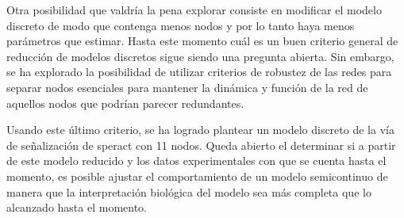 Otra posibilidad que valdría la pena explorar consiste en modificar el modelo discreto de modo que contenga menos nodos y por lo tanto haya menos parámetros que estimar. Hasta este momento cuál es un buen criterio general de reducción de modelos discretos sigue siendo una pregunta abierta. Sin embargo, se ha explorado la posibilidad de utilizar criterios de robustez de las redes para separar nodos esenciales para mantener la dinámica y función de la red de aquellos nodos que podrían parecer redundantes.

Usando este último criterio, se ha logrado plantear un modelo discreto de la vía de señalización de speract con 11 nodos. Queda abierto el determinar si a partir de este modelo reducido y los datos experimentales con que se cuenta hasta el momento, es posible ajustar el comportamiento de un modelo semicontinuo de manera que la interpretación biológica del modelo sea más completa que lo alcanzado hasta el momento.

%


